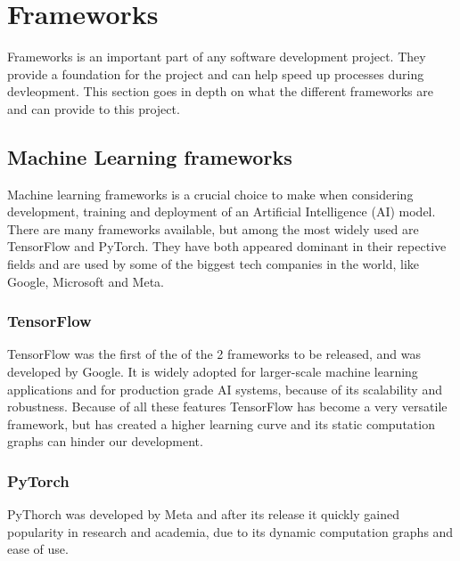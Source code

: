 \section{Frameworks}
\label{sec:Frameworks}

Frameworks is an important part of any software development project. 
They provide a foundation for the project and can help speed up processes 
during devleopment. This section goes in depth on what the different frameworks 
are and can provide to this project.

\subsection{Machine Learning frameworks}

Machine learning frameworks is a crucial choice to make when considering development,
training and deployment of an Artificial Intelligence (AI) model. 
There are many frameworks available, but among the most widely used are TensorFlow
and PyTorch. They have both appeared dominant in their repective fields and are used
by some of the biggest tech companies in the world, like Google, Microsoft and Meta.\cite{PyTorchVsTensorFlow}

\subsubsection{TensorFlow}
TensorFlow was the first of the of the 2 frameworks to be released, 
and was developed by Google. \cite{TensorFlow} It is widely adopted for 
larger-scale machine learning applications and for production grade AI systems, 
because of its scalability and robustness. \cite{simplilearn}
Because of all these features TensorFlow has become a very versatile framework, 
but has created a higher learning curve and its static computation graphs can hinder our development. 


\subsubsection{PyTorch}
PyThorch was developed by Meta and after its release it quickly gained popularity in research and academia,
due to its dynamic computation graphs and ease of use. \cite{PyTorch}

